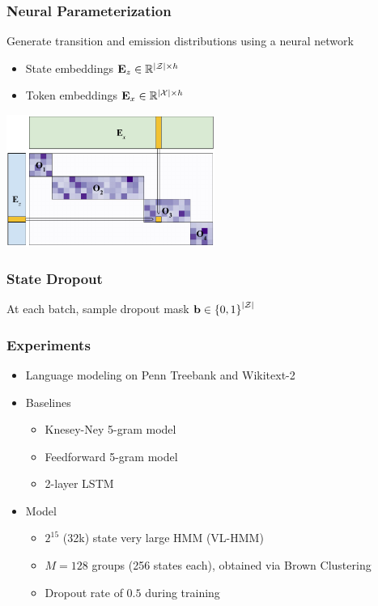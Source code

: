 \documentclass{beamer}
\begin{document}
\begin{frame}
\frametitle{Neural Parameterization}
Generate transition and emission distributions using a neural network
\begin{itemize}
\item State embeddings $\mathbf{E}_z \in \mathbb{R}^{|\mathcal{Z}| \times h}$
\item Token embeddings $\mathbf{E}_x \in \mathbb{R}^{|\mathcal{X}| \times h}$
\end{itemize}
\vspace{0.5em}
\centering
\includegraphics[height=1.7in]{img/blocksparse_mat_no_block.pdf}
\end{frame}

\begin{frame}
\frametitle{State Dropout}
At each batch, sample dropout mask $\mathbf{b} \in \left\{0,1\right\}^{|\mathcal{Z}|}$
\vspace{1em}
\begin{center}
\resizebox{0.75\width}{0.75\height}{

}
\end{center}
\end{frame}

\begin{frame}
\frametitle{Experiments}
\begin{itemize}
\item Language modeling on Penn Treebank and Wikitext-2
\item Baselines
    \begin{itemize}
    \item Knesey-Ney 5-gram model
    \item Feedforward 5-gram model
    \item 2-layer LSTM
    \end{itemize}
\item Model
    \begin{itemize}
    \item $2^{15}$ (32k) state very large HMM (VL-HMM)
    \item $M=128$ groups (256 states each), obtained via Brown Clustering
    \item Dropout rate of $0.5$ during training
    \end{itemize}
\end{itemize}
\end{frame}
\end{document}
